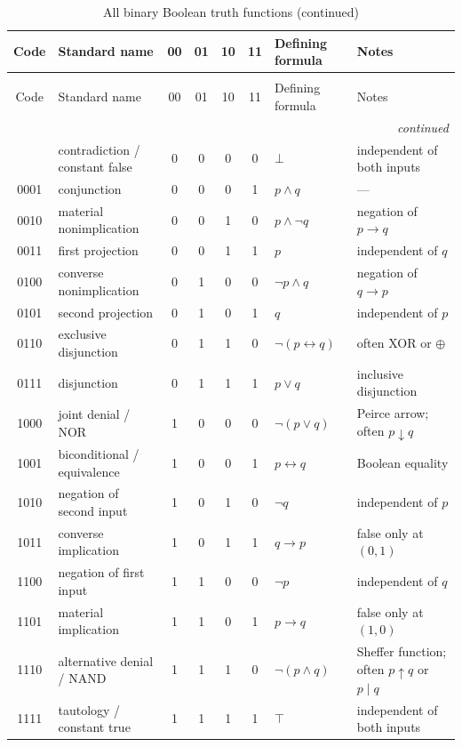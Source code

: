 \begingroup\scriptsize\setlength{\tabcolsep}{3pt}
\begin{longtable}{@{}c p{} cccc p{}p{}@{}}
\caption{All binary Boolean truth functions.}
\label{tab:p01-sixteen}\\
\toprule
Code & Standard name & 00 & 01 & 10 & 11 & Defining formula & Notes \\
\midrule
\endfirsthead
\caption[]{All binary Boolean truth functions (continued)}\\
\toprule
Code & Standard name & 00 & 01 & 10 & 11 & Defining formula & Notes \\
\midrule
\endhead
\midrule\multicolumn{8}{r}{\emph{continued}}\\\endfoot
\endlastfoot
0000 & contradiction / constant false & 0&0&0&0 & \(\bot\) & independent of both inputs \\
0001 & conjunction & 0&0&0&1 & \(p\land q\) & --- \\
0010 & material nonimplication & 0&0&1&0 & \(p\land\neg q\) & negation of \(p\to q\) \\
0011 & first projection & 0&0&1&1 & \(p\) & independent of \(q\) \\
0100 & converse nonimplication & 0&1&0&0 & \(\neg p\land q\) & negation of \(q\to p\) \\
0101 & second projection & 0&1&0&1 & \(q\) & independent of \(p\) \\
0110 & exclusive disjunction & 0&1&1&0 & \(\neg(p\leftrightarrow q)\) & often XOR or \(\oplus\) \\
0111 & disjunction & 0&1&1&1 & \(p\lor q\) & inclusive disjunction \\
1000 & joint denial / NOR & 1&0&0&0 & \(\neg(p\lor q)\) & Peirce arrow; often \(p\downarrow q\) \\
1001 & biconditional / equivalence & 1&0&0&1 & \(p\leftrightarrow q\) & Boolean equality \\
1010 & negation of second input & 1&0&1&0 & \(\neg q\) & independent of \(p\) \\
1011 & converse implication & 1&0&1&1 & \(q\to p\) & false only at \((0,1)\) \\
1100 & negation of first input & 1&1&0&0 & \(\neg p\) & independent of \(q\) \\
1101 & material implication & 1&1&0&1 & \(p\to q\) & false only at \((1,0)\) \\
1110 & alternative denial / NAND & 1&1&1&0 & \(\neg(p\land q)\) & Sheffer function; often \(p\uparrow q\) or \(p\mid q\) \\
1111 & tautology / constant true & 1&1&1&1 & \(\top\) & independent of both inputs \\
\bottomrule
\end{longtable}
\endgroup

